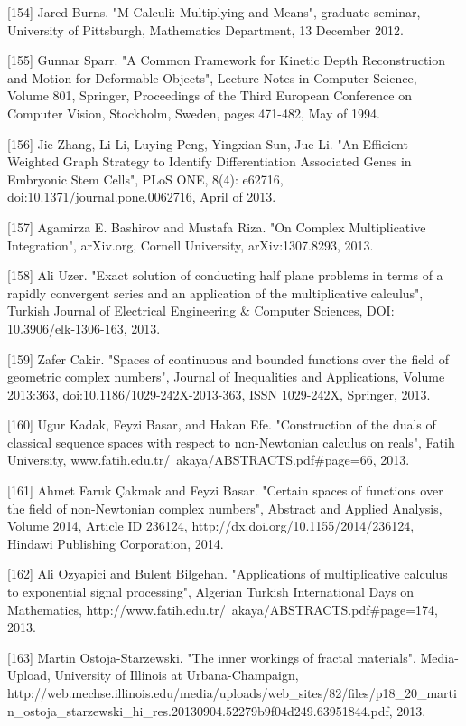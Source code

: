 \documentclass[12pt]{article}
\begin{document}
[154] Jared Burns. "M-Calculi: Multiplying and Means", graduate-seminar, University of Pittsburgh, Mathematics Department, 13 December 2012.

[155] Gunnar Sparr. "A Common Framework for Kinetic Depth Reconstruction and Motion for Deformable Objects", Lecture Notes in Computer Science, Volume 801, Springer, Proceedings of the Third European Conference on Computer Vision, Stockholm, Sweden, pages 471-482, May of 1994.

[156] Jie Zhang, Li Li, Luying Peng, Yingxian Sun, Jue Li. "An Efficient Weighted Graph Strategy to Identify Differentiation Associated Genes in Embryonic Stem Cells", PLoS ONE, 8(4): e62716, doi:10.1371/journal.pone.0062716, April of 2013.

[157] Agamirza E. Bashirov and Mustafa Riza. "On Complex Multiplicative Integration", arXiv.org, Cornell University, arXiv:1307.8293, 2013.

[158] Ali Uzer. "Exact solution of conducting half plane problems in terms of a rapidly convergent series and an application of the multiplicative calculus", Turkish Journal of Electrical Engineering & Computer Sciences, DOI: 10.3906/elk-1306-163, 2013.

[159] Zafer Cakir. "Spaces of continuous and bounded functions over the field of geometric complex numbers", Journal of Inequalities and Applications, Volume 2013:363, doi:10.1186/1029-242X-2013-363, ISSN 1029-242X, Springer, 2013.

[160] Ugur Kadak, Feyzi Basar, and Hakan Efe. "Construction of the duals of classical sequence spaces with respect to non-Newtonian calculus on reals", Fatih University, www.fatih.edu.tr/~akaya/ABSTRACTS.pdf#page=66, 2013.

[161] Ahmet Faruk Çakmak and Feyzi Basar. "Certain spaces of functions over the field of non-Newtonian complex numbers", Abstract and Applied Analysis, Volume 2014, Article ID 236124, http://dx.doi.org/10.1155/2014/236124, Hindawi Publishing Corporation, 2014.

[162] Ali Ozyapici and Bulent Bilgehan. "Applications of multiplicative calculus to exponential signal processing", Algerian Turkish International Days on Mathematics, http://www.fatih.edu.tr/~akaya/ABSTRACTS.pdf#page=174, 2013.

[163] Martin Ostoja-Starzewski. "The inner workings of fractal materials", Media-Upload, University of Illinois at Urbana-Champaign, http://web.mechse.illinois.edu/media/uploads/web_sites/82/files/p18_20_martin_ostoja_starzewski_hi_res.20130904.52279b9f04d249.63951844.pdf, 2013.
\end{document}
